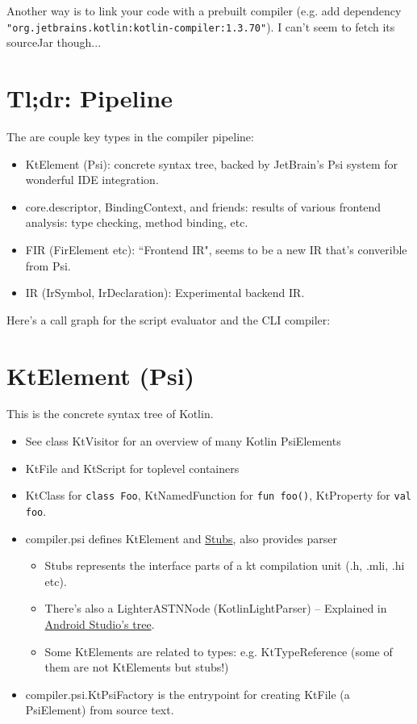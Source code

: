 \documentclass{article}
\begin{document}
Another way is to link your code with a prebuilt compiler (e.g. add dependency \texttt{"org.jetbrains.kotlin:kotlin-compiler:1.3.70"}). I can't seem to fetch its sourceJar though...

\section{Tl;dr: Pipeline}

The are couple key types in the compiler pipeline:

\begin{itemize}
    \item KtElement (Psi): concrete syntax tree, backed by JetBrain's Psi system for wonderful IDE integration.
    \item core.descriptor, BindingContext, and friends: results of various frontend analysis: type checking, method binding, etc.
    \item FIR (FirElement etc): ``Frontend IR", seems to be a new IR that's converible from Psi.
    \item IR (IrSymbol, IrDeclaration): Experimental backend IR.
\end{itemize}

Here's a call graph for the script evaluator and the CLI compiler:
\begin{dot2tex}[dot,scale=0.3]

\end{dot2tex}

\section{KtElement (Psi)}

This is the concrete syntax tree of Kotlin.

\begin{itemize}
    \item See class KtVisitor for an overview of many Kotlin PsiElements
    \item KtFile and KtScript for toplevel containers
    \item KtClass for \texttt{class Foo}, KtNamedFunction for \texttt{fun foo()}, KtProperty for \texttt{val foo}.
    \item compiler.psi defines KtElement and \href{https://www.jetbrains.org/intellij/sdk/docs/basics/indexing_and_psi_stubs/stub_indexes.html}{Stubs}, also provides parser
    \begin{itemize}
        \item Stubs represents the interface parts of a kt compilation unit
        (.h, .mli, .hi etc).
        \item There's also a LighterASTNNode (KotlinLightParser) -- Explained in \href{https://github.com/JetBrains/android/blob/230f7af2/android/docs/kotlin-light-classes.md}{Android Studio's tree}.
        \item Some KtElements are related to types: e.g. KtTypeReference (some of them are not KtElements but stubs!)
    \end{itemize}
    \item compiler.psi.KtPsiFactory is the entrypoint for creating KtFile (a PsiElement) from source text.
\end{itemize}
\end{document}
